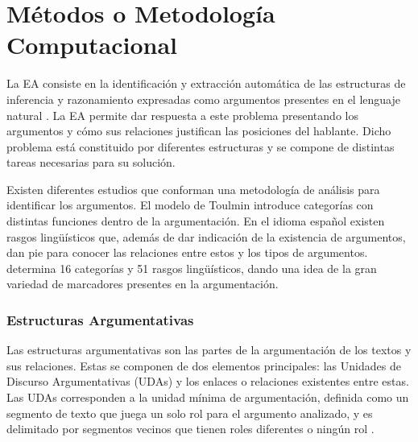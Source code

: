 \documentclass{rcci} %
\begin{document}
\parskip=12pt
\section*{M\'etodos o Metodolog\'ia Computacional}\label{metodos}




La EA consiste en la identificaci\'on y extracci\'on 
autom\'atica de las estructuras de inferencia y 
razonamiento expresadas como argumentos presentes en el lenguaje natural \citep{lawrence2020argument}.
La EA permite dar respuesta a este problema presentando
los argumentos y c\'omo sus relaciones justifican las posiciones del hablante. Dicho problema est\'a constituido por diferentes 
estructuras y se compone de distintas tareas necesarias para su soluci\'on.

Existen diferentes estudios que conforman una metodolog\'ia de an\'alisis para
identificar los argumentos. El modelo de Toulmin \citep{toulmin_2003} introduce categor\'ias 
con distintas funciones dentro de la argumentaci\'on. En 
el idioma espa\~nol existen rasgos ling\"u\'isticos que, adem\'as de dar indicaci\'on de la existencia de argumentos, 
dan pie para conocer las relaciones entre estos y los tipos de argumentos. \citep{venegas2005hacia}
determina 16 categor\'ias y 51 rasgos ling\"u\'isticos, dando una idea de la gran variedad de marcadores 
presentes en la argumentaci\'on.

\subsubsection*{Estructuras Argumentativas}

Las estructuras argumentativas son las partes de la argumentaci\'on de los textos y sus relaciones.
Estas se componen de dos elementos principales: las Unidades de Discurso Argumentativas (UDAs) y los enlaces
o relaciones existentes entre estas. Las UDAs corresponden a la unidad m\'inima de argumentaci\'on, definida 
como un segmento de texto que juega un solo rol para el argumento analizado, y es 
delimitado por segmentos vecinos que tienen roles diferentes o ning\'un rol \citep{stede2018argumentation}.
\end{document}
